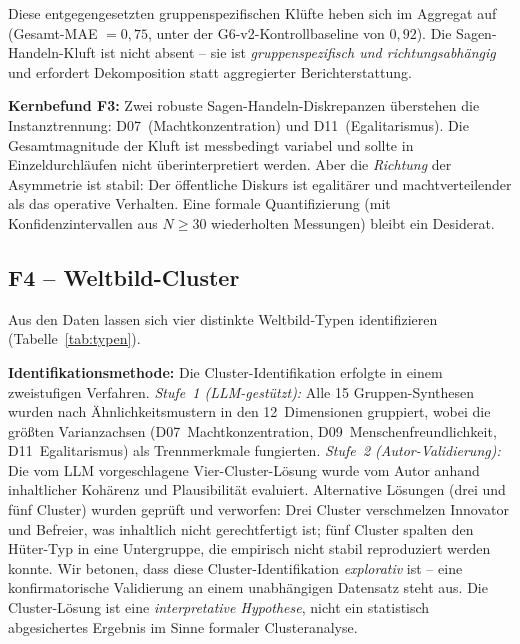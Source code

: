 \documentclass[12pt,a4paper]{article}
\begin{document}
\noindent Diese entgegengesetzten gruppenspezifischen Klüfte heben sich im Aggregat auf (Gesamt-MAE $= 0{,}75$, unter der G6-v2-Kontrollbaseline von $0{,}92$). Die Sagen-Handeln-Kluft ist nicht absent -- sie ist \emph{gruppenspezifisch und richtungsabhängig} und erfordert Dekomposition statt aggregierter Berichterstattung.

\medskip
\noindent\textbf{Kernbefund F3:} Zwei robuste Sagen-Handeln-Diskrepanzen überstehen die Instanztrennung: D07~(Machtkonzentration) und D11~(Egalitarismus). Die Gesamtmagnitude der Kluft ist messbedingt variabel und sollte in Einzeldurchläufen nicht überinterpretiert werden. Aber die \emph{Richtung} der Asymmetrie ist stabil: Der öffentliche Diskurs ist egalitärer und machtverteilender als das operative Verhalten. Eine formale Quantifizierung (mit Konfidenzintervallen aus $N \geq 30$ wiederholten Messungen) bleibt ein Desiderat.


\subsection{F4 -- Weltbild-Cluster}
\label{sec:ergebnisse:f4}

Aus den Daten lassen sich vier distinkte Weltbild-Typen identifizieren (Tabelle~\ref{tab:typen}).

\textbf{Identifikationsmethode:} Die Cluster-Identifikation erfolgte in einem zweistufigen Verfahren. \emph{Stufe~1 (LLM-gestützt):} Alle 15 Gruppen-Synthesen wurden nach Ähnlichkeitsmustern in den 12~Dimensionen gruppiert, wobei die größten Varianzachsen (D07~Machtkonzentration, D09~Menschenfreundlichkeit, D11~Egalitarismus) als Trennmerkmale fungierten. \emph{Stufe~2 (Autor-Validierung):} Die vom LLM vorgeschlagene Vier-Cluster-Lösung wurde vom Autor anhand inhaltlicher Kohärenz und Plausibilität evaluiert. Alternative Lösungen (drei und fünf Cluster) wurden geprüft und verworfen: Drei Cluster verschmelzen Innovator und Befreier, was inhaltlich nicht gerechtfertigt ist; fünf Cluster spalten den Hüter-Typ in eine Untergruppe, die empirisch nicht stabil reproduziert werden konnte. Wir betonen, dass diese Cluster-Identifikation \emph{explorativ} ist -- eine konfirmatorische Validierung an einem unabhängigen Datensatz steht aus. Die Cluster-Lösung ist eine \emph{interpretative Hypothese}, nicht ein statistisch abgesichertes Ergebnis im Sinne formaler Clusteranalyse.
\end{document}
